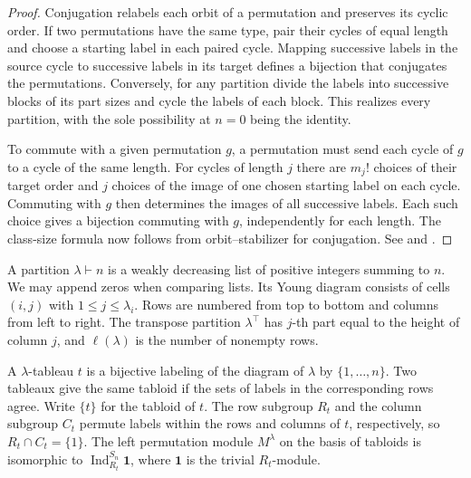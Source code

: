 \begin{proof}
Conjugation relabels each orbit of a permutation and preserves its
cyclic order. If two permutations have the same type, pair their cycles
of equal length and choose a starting label in each paired cycle.
Mapping successive labels in the source cycle to successive labels in
its target defines a bijection that conjugates the permutations.
Conversely, for any partition divide the labels into successive blocks of
its part sizes and cycle the labels of each block. This realizes every
partition, with the sole possibility at \(n=0\) being the identity.

To commute with a given permutation \(g\), a permutation must send each
cycle of \(g\) to a cycle of the same length. For cycles of length \(j\)
there are \(m_j!\) choices of their target order and \(j\) choices of
the image of one chosen starting label on each cycle. Commuting with
\(g\) then determines the images of all successive labels. Each such
choice gives a bijection commuting with \(g\), independently for each
length. The class-size formula now follows from orbit--stabilizer for
conjugation. See \cite[\S2.1]{sagan} and \cite[\S4.14]{etingof}.
\end{proof}

A partition \(\lambda\vdash n\) is a weakly decreasing list of positive
integers summing to \(n\). We may append zeros when comparing lists.
Its Young diagram consists of cells \((i,j)\) with \(1\leq j\leq\lambda_i\).
Rows are numbered from top to bottom and columns from left to right.
The transpose partition \(\lambda^\top\) has \(j\)-th part equal to the
height of column \(j\), and \(\ell(\lambda)\) is the number of nonempty rows.

\begin{proposition}
\label{res:A02}
A \(\lambda\)-tableau \(t\) is a bijective labeling of the diagram of
\(\lambda\) by \(\{1,\ldots,n\}\). Two tableaux give the same tabloid if
the sets of labels in the corresponding rows agree. Write \(\{t\}\)
for the tabloid of \(t\). The row subgroup \(R_t\) and the column
subgroup \(C_t\) permute labels within the rows and columns of \(t\),
respectively, so \(R_t\cap C_t=\{1\}\). The left permutation module
\(M^\lambda\) on the basis of tabloids is isomorphic to
\(\operatorname{Ind}_{R_t}^{S_n}\mathbf 1\), where \(\mathbf 1\) is the
trivial \(R_t\)-module.
\end{proposition}

